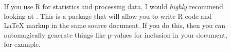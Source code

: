 \begin{description}
	\item[]{%
		If you use R for statistics and processing data, I would \emph{highly} recommend looking at \href{http://yihui.name/knitr/}{}.
		This is a package that will allow you to write R code and \LaTeX{} markup in the same source document.
		If you do this, then you can automagically generate things like p-values for inclusion in your document, for example.%
	}

\end{description}